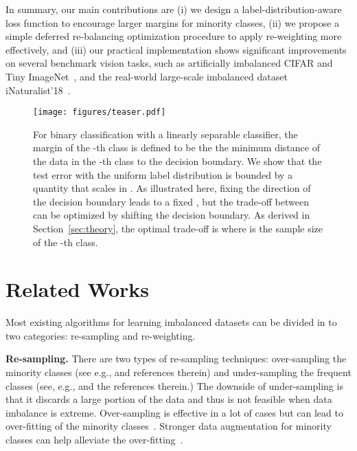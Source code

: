 \documentclass{article}
\begin{document}
In summary, our main contributions are (i) we design a label-distribution-aware loss function to encourage larger margins for minority classes, (ii) we propose a simple deferred re-balancing optimization procedure to apply re-weighting more effectively, and (iii) our practical implementation shows significant improvements on several benchmark vision tasks, such as artificially imbalanced CIFAR and Tiny ImageNet~\citep{tinyimagenet}, and the real-world large-scale imbalanced dataset iNaturalist'18~\citep{van2018inaturalist}. 
 
\begin{figure}
  \begin{minipage}[c]{0.47\textwidth}
    \texttt{[image: figures/teaser.pdf]}
  \end{minipage}\hfill
  \begin{minipage}[c]{0.49\textwidth}
    \caption{
       For binary classification with a linearly separable classifier, the margin  of the -th class is defined to be the the minimum distance of the data in the -th class to the decision boundary. We show that the test error with the uniform label distribution is bounded by a quantity that scales in . 
    As illustrated here, fixing the direction of the decision boundary leads to a fixed , but the trade-off between  can be optimized by shifting the decision boundary. As derived in Section~\ref{sec:theory}, the optimal trade-off is  where  is the sample size of  the -th class.
    } \label{fig:margin}	
  \end{minipage}
\end{figure}

\section{Related Works}



Most existing algorithms for learning imbalanced datasets can be divided in to two categories: re-sampling and re-weighting.

\textbf{Re-sampling.} There are two types of re-sampling techniques: over-sampling the minority classes (see e.g., \citep{shen2016relay,zhong2016towards,buda2018systematic,byrd2019what} and references therein) and under-sampling the frequent classes (see, e.g., \citep{he2008learning,japkowicz2002class,buda2018systematic} and the references therein.)
The downside of under-sampling is that it discards a large portion of the data and thus is not feasible when data imbalance is extreme. Over-sampling is effective in a lot of cases but can lead to over-fitting of the minority classes~\citep{chawla2002smote,cui2019classbalancedloss}. Stronger data augmentation for minority classes can help alleviate the over-fitting~\citep{chawla2002smote,zou2018domain}.
\end{document}
